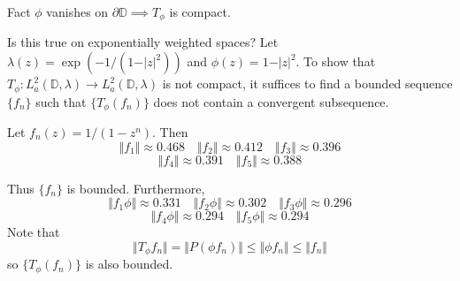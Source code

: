 \documentclass{beamer}
\begin{document}
\begin{frame}
\begin{block}{Fact}
$\phi$ vanishes on $\partial{\mathbb{D}} \implies T_\phi$ is compact.
\end{block}
Is this true on exponentially weighted spaces? Let $\lambda(z) = \exp(-1/(1-\vert z\vert^2))$ and $\phi(z) = 1 - \vert z \vert^2$. To show that $T_\phi: L_a^2(\mathbb{D},\lambda) \rightarrow L_a^2(\mathbb{D},\lambda)$ is not compact, it suffices to find a bounded sequence $\{f_n\}$ such that $\{T_\phi(f_n)\}$ does not contain a convergent subsequence.

Let $f_n(z)  = 1/(1-z^n)$. Then 
\[
\Vert f_1 \Vert \approx 0.468 \quad \Vert f_2 \Vert \approx 0.412 \quad \Vert f_3 \Vert \approx 0.396 
\]
\[
\Vert f_4 \Vert \approx  0.391 \quad \Vert f_5 \Vert \approx 0.388
\]
\end{frame} 
\begin{frame}
Thus $\{f_n\}$ is bounded. Furthermore,
\[
\Vert f_1 \phi \Vert \approx 0.331 \quad \Vert f_2 \phi \Vert \approx 0.302 \quad \Vert f_3 \phi \Vert \approx 0.296 
\]
\[
\Vert f_4 \phi \Vert \approx 0.294 \quad \Vert f_5 \phi \Vert \approx 0.294
\]
Note that
\[
\Vert T_\phi f_n \Vert = \Vert P(\phi f_n) \Vert \leq \Vert \phi f_n \Vert \leq \Vert f_n \Vert
\] so $\{T_\phi(f_n)\}$ is also bounded.
\end{frame}
\end{document}
